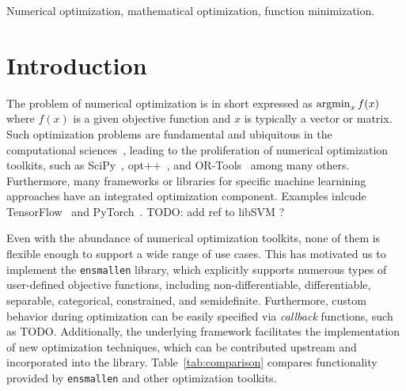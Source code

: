 \documentclass[twoside,11pt]{article}
\begin{document}
\begin{keywords}
  Numerical optimization, mathematical optimization, function minimization.
\end{keywords}

\section{Introduction}
\label{sec:introduction}

The problem of numerical optimization is in short expressed as
$\operatornamewithlimits{argmin}_x f(x)$
where $f(x)$ is a given objective function and $x$ is typically a vector or matrix.
Such optimization problems are fundamental and ubiquitous in the computational sciences~\citep{Nocedal_2006},
leading to the proliferation of numerical optimization toolkits,
such as SciPy~\citep{2019arXiv190710121V},
opt++~\citep{meza1994opt++},
and 
OR-Tools~\citep{ortools} among many others.
Furthermore, many frameworks or libraries for specific machine learnining approaches
have an integrated optimization component.
Examples inlcude TensorFlow~\citep{tensorflow2015-whitepaper} and PyTorch~\citep{NEURIPS2019_9015}.
TODO: add ref to libSVM ?


Even with the abundance of numerical optimization toolkits,
none of them is flexible enough to support a wide range of use cases.
This has motivated us to implement the {\tt ensmallen} library,
which explicitly supports numerous types of user-defined objective functions,
including non-differentiable, differentiable, separable, categorical, constrained, and semidefinite.
Furthermore, custom behavior during optimization can be easily specified via {\it callback} functions,
such as TODO.
Additionally, the underlying framework facilitates the implementation of new optimization techniques,
which can be contributed upstream and incorporated into the library.
Table~\ref{tab:comparison} compares functionality provided
by {\tt ensmallen} and other optimization toolkits.
\end{document}
